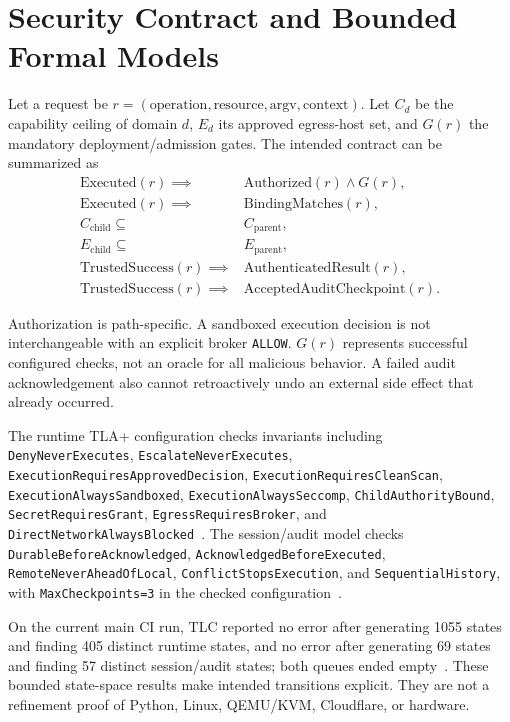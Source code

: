 \documentclass[journal]{IEEEtran}
\begin{document}
\section{Security Contract and Bounded Formal Models}
Let a request be $r=(\mathrm{operation},\mathrm{resource},\mathrm{argv},\mathrm{context})$. Let $C_d$ be the capability ceiling of domain $d$, $E_d$ its approved egress-host set, and $G(r)$ the mandatory deployment/admission gates. The intended contract can be summarized as
\begin{align*}
\mathrm{Executed}(r) \implies{} & \mathrm{Authorized}(r) \land G(r), \\
\mathrm{Executed}(r) \implies{} & \mathrm{BindingMatches}(r), \\
C_{\mathrm{child}} \subseteq{} & C_{\mathrm{parent}}, \\
E_{\mathrm{child}} \subseteq{} & E_{\mathrm{parent}}, \\
\mathrm{TrustedSuccess}(r) \implies{} & \mathrm{AuthenticatedResult}(r), \\
\mathrm{TrustedSuccess}(r) \implies{} & \mathrm{AcceptedAuditCheckpoint}(r).
\end{align*}

Authorization is path-specific. A sandboxed execution decision is not interchangeable with an explicit broker \texttt{ALLOW}. $G(r)$ represents successful configured checks, not an oracle for all malicious behavior. A failed audit acknowledgement also cannot retroactively undo an external side effect that already occurred.

The runtime TLA+ configuration checks invariants including \texttt{DenyNeverExecutes}, \texttt{EscalateNeverExecutes}, \texttt{ExecutionRequiresApprovedDecision}, \texttt{ExecutionRequiresCleanScan}, \texttt{ExecutionAlwaysSandboxed}, \texttt{ExecutionAlwaysSeccomp}, \texttt{ChildAuthorityBound}, \texttt{SecretRequiresGrant}, \texttt{EgressRequiresBroker}, and \texttt{DirectNetworkAlwaysBlocked}~\cite{BULL_TLARuntime}. The session/audit model checks \texttt{DurableBeforeAcknowledged}, \texttt{AcknowledgedBeforeExecuted}, \texttt{RemoteNeverAheadOfLocal}, \texttt{ConflictStopsExecution}, and \texttt{SequentialHistory}, with \texttt{MaxCheckpoints=3} in the checked configuration~\cite{BULL_TLASessionAudit}.

On the current main CI run, TLC reported no error after generating 1055 states and finding 405 distinct runtime states, and no error after generating 69 states and finding 57 distinct session/audit states; both queues ended empty~\cite{BULL_CI_Formal}. These bounded state-space results make intended transitions explicit. They are not a refinement proof of Python, Linux, QEMU/KVM, Cloudflare, or hardware.
\end{document}
